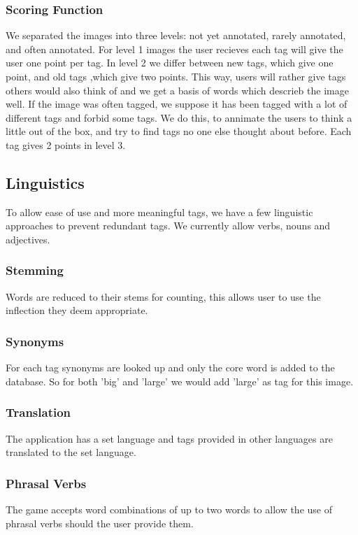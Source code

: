 \subsubsection{Scoring Function}
\label{g14:sec:concepts:spamprevention:scoringfunction}
We separated the images into three levels: not yet annotated, rarely annotated, and often annotated. For level 1 images the user recieves each tag will give the user one point per tag. In level 2 we differ between new tags, which give one point, and old tags ,which give two points. This way, users will rather give tags others would also think of and we get a basis of words which descrieb the image well. If the image was often tagged, we suppose it has been tagged with a lot of different tags and forbid some tags. We do this, to annimate the users to think a little out of the box, and try to find tags no one else thought about before. Each tag gives 2 points in level 3.


\subsection{Linguistics}
\label{g14:sec:concepts:linguistics}
To allow ease of use and more meaningful tags, we have a few linguistic approaches to prevent redundant tags. We currently allow verbs, nouns and adjectives.



\subsubsection{Stemming}
\label{g14:sec:concepts:linguistics:stemming}
Words are reduced to their stems for counting, this allows user to use the inflection they deem appropriate.


\subsubsection{Synonyms}
\label{g14:sec:concepts:linguistics:synonyms}
For each tag synonyms are looked up and only the core word is added to the database. So for both 'big' and 'large' we would add 'large' as tag for this image.


\subsubsection{Translation}
\label{g14:sec:concepts:linguistics:translation}
The application has a set language and tags provided in other languages are translated to the set language.


\subsubsection{Phrasal Verbs}
\label{g14:sec:concepts:linguistics:phraselverbs}
The game accepts word combinations of up to two words to allow the use of phrasal verbs should the user provide them.


